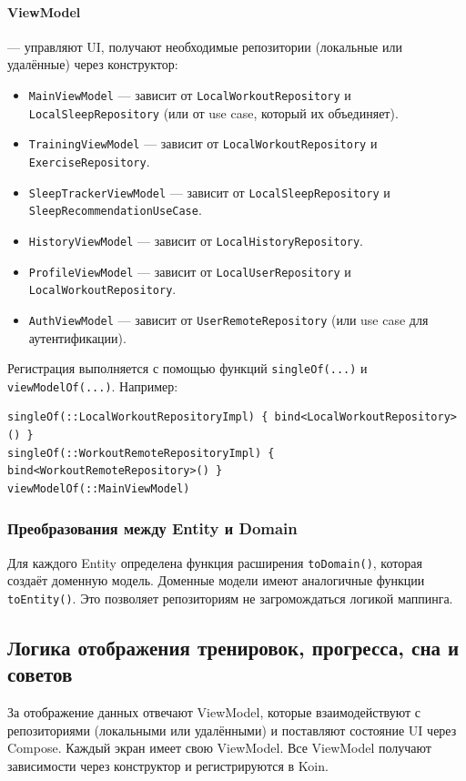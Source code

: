 \paragraph{ViewModel} — управляют UI, получают необходимые репозитории (локальные или удалённые) через конструктор:
\begin{itemize}
    \item \texttt{MainViewModel} — зависит от \texttt{LocalWorkoutRepository} и \texttt{LocalSleepRepository} (или от use case, который их объединяет).
    \item \texttt{TrainingViewModel} — зависит от \texttt{LocalWorkoutRepository} и \texttt{ExerciseRepository}.
    \item \texttt{SleepTrackerViewModel} — зависит от \texttt{LocalSleepRepository} и \texttt{SleepRecommendationUseCase}.
    \item \texttt{HistoryViewModel} — зависит от \texttt{LocalHistoryRepository}.
    \item \texttt{ProfileViewModel} — зависит от \texttt{LocalUserRepository} и \texttt{LocalWorkoutRepository}.
    \item \texttt{AuthViewModel} — зависит от \texttt{UserRemoteRepository} (или use case для аутентификации).
\end{itemize}

Регистрация выполняется с помощью функций \texttt{singleOf(...)} и \texttt{viewModelOf(...)}. Например:
\begin{verbatim}
singleOf(::LocalWorkoutRepositoryImpl) { bind<LocalWorkoutRepository>() }
singleOf(::WorkoutRemoteRepositoryImpl) { bind<WorkoutRemoteRepository>() }
viewModelOf(::MainViewModel)
\end{verbatim}

\subsubsection{Преобразования между Entity и Domain}

Для каждого Entity определена функция расширения \texttt{toDomain()}, которая создаёт доменную модель. Доменные модели имеют аналогичные функции \texttt{toEntity()}. Это позволяет репозиториям не загромождаться логикой маппинга.

\subsection{Логика отображения тренировок, прогресса, сна и советов}

За отображение данных отвечают ViewModel, которые взаимодействуют с репозиториями (локальными или удалёнными) и поставляют состояние UI через Compose. Каждый экран имеет свою ViewModel. Все ViewModel получают зависимости через конструктор и регистрируются в Koin.

